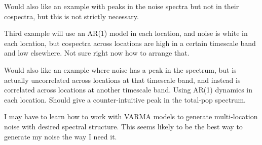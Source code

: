 \documentclass[letterpaper,11pt]{article}
\begin{document}
Would also like an example with peaks in the noise spectra but not in their cospectra,
but this is not strictly necessary.

Third example will use an AR(1) model in each location, and noise is white in each location, but cospectra across locations are high in a certain timescale band and low elsewhere. Not sure right now how to arrange that. 

Would also like an example where noise has a peak in the spectrum, but is actually
uncorrelated across locations at that timescale band, and instead is correlated across
locations at another timescale band. Using AR(1) dynamics in each location. Should 
give a counter-intuitive peak in the total-pop spectrum. 

I may have to learn how to work with VARMA models to generate multi-location
noise with desired spectral structure. This seems likely to be the best way to
generate my noise the way I need it.



\end{document}
